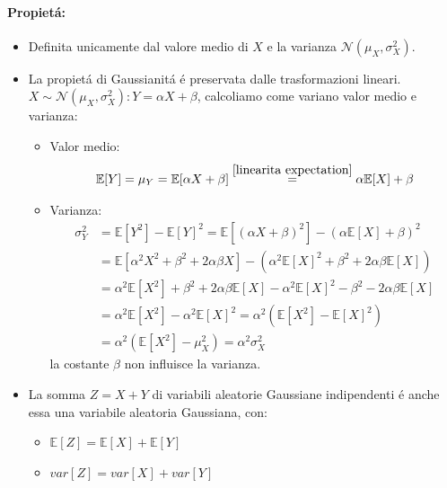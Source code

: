         \paragraph{Propietá:}\label{propieta distr gaussiana}
        \begin{itemize}
            \item {Definita unicamente dal valore medio di $X$ e la varianza $\mathcal{N}(\mu_X,\sigma_X^2)$.}
            \item {\begin{sloppypar}
                La propietá di Gaussianitá é preservata dalle trasformazioni lineari. ${X \sim \mathcal{N}(\mu_X,\sigma_X^2): Y = \alpha X+\beta}$, calcoliamo come variano 
                valor medio e varianza:
            \end{sloppypar}
                \begin{itemize}
                    \item {Valor medio:
                        \[
                            \mathbb{E}[Y] = \mu_Y = \mathbb{E}[\alpha X+\beta]  \overset{\ref{linearita expectation}}{=} \alpha \mathbb{E}[X] + \beta
                        \]
                    }
                    \item {Varianza:
                        \begin{align}
                            \sigma_Y^2  &= \mathbb{E}[Y^2] -\mathbb{E}[Y]^2 =\mathbb{E}[(\alpha X + \beta)^2] -(\alpha \mathbb{E}[X] + \beta)^2 \nonumber \\
                                        &= \mathbb{E}[\alpha^2 X^2 + \beta^2 +2\alpha\beta X] -(\alpha^2 \mathbb{E}[X]^2 + \beta^2 +2\alpha\beta\mathbb{E}[X])\nonumber \\
                                        &= \alpha^2 \mathbb{E}[X^2] + \beta^2 +2\alpha\beta \mathbb{E}[X] -\alpha^2 \mathbb{E}[X]^2 - \beta^2 -2\alpha\beta\mathbb{E}[X]\nonumber \\
                                        &= \alpha^2 \mathbb{E}[X^2] -\alpha^2 \mathbb{E}[X]^2 = \alpha^2 (\mathbb{E}[X^2] -\mathbb{E}[X]^2)\nonumber \\
                                        &= \alpha^2 (\mathbb{E}[X^2] -\mu_X^2)=\alpha^2 \sigma_X^2\nonumber
                        \end{align}                         
                        la costante $\beta$ non influisce la varianza.  
                    }
                \end{itemize}}
            \item {La somma $Z = X+Y$ di variabili aleatorie Gaussiane indipendenti é anche essa una variabile aleatoria
                Gaussiana, con:
                    \begin{itemize}
                        \item {$\mathbb{E}[Z] = \mathbb{E}[X] +\mathbb{E}[Y] $}
                        \item {$var[Z] = var[X] +var[Y] $}
                    \end{itemize}}
        \end{itemize}
